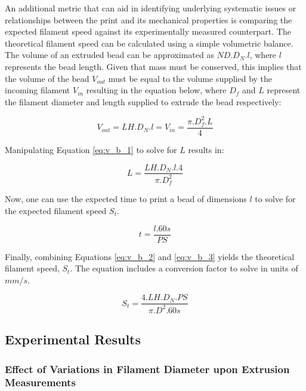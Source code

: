 \documentclass[main.tex]{subfiles}
\begin{document}
An additional metric that can aid in identifying underlying systematic issues or relationships between the print and its mechanical properties is comparing the expected filament speed against its experimentally measured counterpart. The theoretical filament speed can be calculated using a simple volumetric balance. The volume of an extruded bead can be approximated as $ND. D_{N}. l$, where $l$ represents the bead length. Given that mass must be conserved, this implies that the volume of the bead $V_{out}$ must be equal to the volume supplied by the incoming filament $V_{in}$ resulting in the equation below, where $D_{f}$ and $L$ represent the filament diameter and length supplied to extrude the bead respectively:

\begin{equation} \label{eq:v_b_1}
	V_{out}= LH . D_{N} . l = V_{in} = \frac{\pi . D_{f}^2 . L}{4}
\end{equation}

Manipulating Equation \ref{eq:v_b_1} to solve for $L$ results in:

\begin{equation} \label{eq:v_b_2}
	L = \frac{LH. D_{N}. l. 4}{\pi . D_{f}^2}
\end{equation}

Now, one can use the expected time to print a bead of dimensions $l$ to solve for the expected filament speed $S_{t}$.

\begin{equation} \label{eq:v_b_3}
	t = \frac{l. 60 s}{PS}
\end{equation}

Finally, combining Equations \ref{eq:v_b_2} and \ref{eq:v_b_3} yields the theoretical filament speed, $S_{t}$. The equation includes a conversion factor to solve in units of $mm/s$.

\begin{equation} \label{eq:v_b_4}
	S_{t}=\frac{4. LH. D_{N}. PS}{\pi . D^2 . 60s}
\end{equation}

\subsection{Experimental Results}\label{ssec:ml_exp_r}

\subsubsection{Effect of Variations in Filament Diameter upon Extrusion Measurements}
\end{document}
